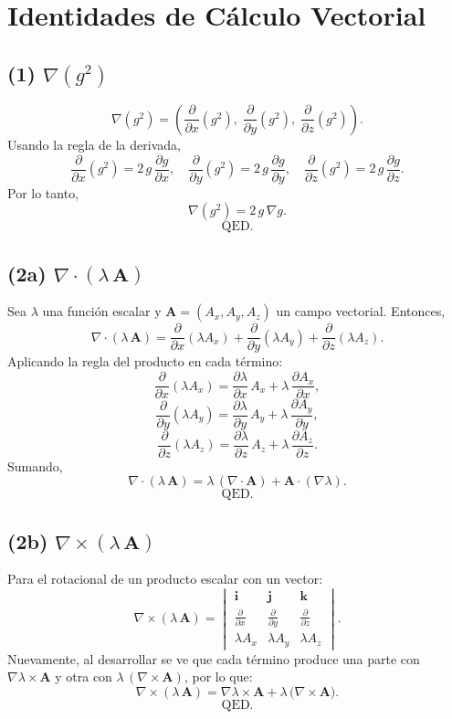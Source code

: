 \documentclass[12pt]{article}
\begin{document}
\section*{Identidades de Cálculo Vectorial}

\subsection*{(1) $\nabla(g^2)$}
\[
\nabla(g^2) 
= \left( \frac{\partial}{\partial x}(g^2), \; \frac{\partial}{\partial y}(g^2), \; \frac{\partial}{\partial z}(g^2) \right).
\]
Usando la regla de la derivada,
\[
\frac{\partial}{\partial x}(g^2) 
= 2\,g \,\frac{\partial g}{\partial x}, 
\quad
\frac{\partial}{\partial y}(g^2) 
= 2\,g \,\frac{\partial g}{\partial y}, 
\quad
\frac{\partial}{\partial z}(g^2) 
= 2\,g \,\frac{\partial g}{\partial z}.
\]
Por lo tanto,
\[
\nabla(g^2) 
= 2\,g \,\nabla g.
\]
\[
\text{QED.}
\]

\subsection*{(2a) $\nabla \cdot (\lambda\,\mathbf{A})$}
Sea $\lambda$ una función escalar y $\mathbf{A} = (A_x, A_y, A_z)$ un campo vectorial. Entonces,
\[
\nabla \cdot (\lambda\,\mathbf{A})
= \frac{\partial}{\partial x}(\lambda A_x)
+ \frac{\partial}{\partial y}(\lambda A_y)
+ \frac{\partial}{\partial z}(\lambda A_z).
\]
Aplicando la regla del producto en cada término:
\[
\frac{\partial}{\partial x}(\lambda A_x)
= \frac{\partial \lambda}{\partial x}\,A_x
+ \lambda \,\frac{\partial A_x}{\partial x},
\]
\[
\frac{\partial}{\partial y}(\lambda A_y)
= \frac{\partial \lambda}{\partial y}\,A_y
+ \lambda \,\frac{\partial A_y}{\partial y},
\]
\[
\frac{\partial}{\partial z}(\lambda A_z)
= \frac{\partial \lambda}{\partial z}\,A_z
+ \lambda \,\frac{\partial A_z}{\partial z}.
\]
Sumando,
\[
\nabla \cdot (\lambda\,\mathbf{A})
= \lambda\,(\nabla \cdot \mathbf{A})
+ \mathbf{A} \cdot (\nabla \lambda).
\]
\[
\text{QED.}
\]

\subsection*{(2b) $\nabla \times (\lambda\,\mathbf{A})$}
Para el rotacional de un producto escalar con un vector:
\[
\nabla \times (\lambda\,\mathbf{A})
= \begin{vmatrix}
\mathbf{i} & \mathbf{j} & \mathbf{k} \\[6pt]
\displaystyle \frac{\partial}{\partial x} & \displaystyle \frac{\partial}{\partial y} & \displaystyle \frac{\partial}{\partial z} \\[6pt]
\lambda A_x & \lambda A_y & \lambda A_z
\end{vmatrix}.
\]
Nuevamente, al desarrollar se ve que cada término produce una parte con $\nabla \lambda \times \mathbf{A}$ y otra con $\lambda\,(\nabla \times \mathbf{A})$, por lo que:
\[
\nabla \times (\lambda\,\mathbf{A})
= \nabla \lambda \times \mathbf{A}
+ \lambda \,\bigl(\nabla \times \mathbf{A}\bigr).
\]
\[
\text{QED.}
\]
\end{document}
